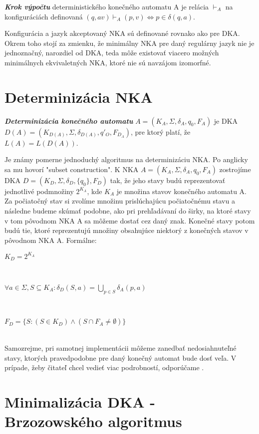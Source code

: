 \begin{defn}{\textbf {\textit {Krok výpočtu}}} deterministického konečného automatu A je relácia $\vdash_A$ na konfiguráciách definovaná $(q,av)\vdash_A(p,v) \Longleftrightarrow p \in \delta(q,a)$.\end{defn}

Konfigurácia a jazyk akceptovaný NKA sú definované rovnako ako pre DKA. Okrem toho stojí za zmienku, že minimálny NKA pre daný regulárny jazyk nie je jednoznačný, narozdiel od DKA, teda môže existovať viacero možných minimálnych ekvivaletných NKA, ktoré nie sú navzájom izomorfné.


\section{Determinizácia NKA}

\begin{defn}{\textbf {\textit {Determinizácia konečného automatu}}} $A = (K_A,\Sigma,\delta_A,q_{0},F_A)$ je DKA $D(A) = (K_{D(A)},\Sigma,\delta_{D(A)},q'_{O},F_{D_A})$, pre ktorý platí, že $L(A) = L(D(A))$.
\end{defn}

Je známy pomerne jednoduchý algoritmus na determinizáciu NKA. Po anglicky sa mu hovorí "subset construction". K NKA $A = (K_A,\Sigma,\delta_A,q_0,F_A)$ zostrojíme DKA $D = (K_D,\Sigma,\delta_D,\{q_0\},F_D)$ tak, že jeho stavy budú reprezentovať jednotlivé podmnožiny $2^{K_A}$, kde $K_A$ je množina stavov konečného automatu A. Za počiatočný stav si zvolíme množinu prislúchajúcu počiatočnému stavu a následne budeme skúmať podobne, ako pri prehľadávaní do širky, na ktoré stavy v tom pôvodnom NKA A sa môžeme dostať cez daný znak. Konečné stavy potom budú tie, ktoré reprezentujú množiny obsahujúce niektorý z konečných stavov v pôvodnom NKA A. Formálne: 
\\
\centerline {$K_D = 2^{K_A}$}
\\
\centerline {$\forall a \in \Sigma, S \subseteq K_A: \delta_D(S,a) = {\bigcup}_{p \in S} \delta_A(p,a)$}
\\
\centerline {$F_D = \{S: (S \in K_D) \wedge (S \cap F_A \neq \emptyset)\}$}
\\
Samozrejme, pri samotnej implementácii môžeme zanedbať nedosiahnuteľné stavy, ktorých pravedpodobne pre daný konečný automat bude dosť veľa. V prípade, žeby čitateľ chcel vedieť viac podrobností, odporúčame \cite[Kapitola 2.3.5]{hopcroft}.

\section{Minimalizácia DKA - Brzozowského algoritmus}

